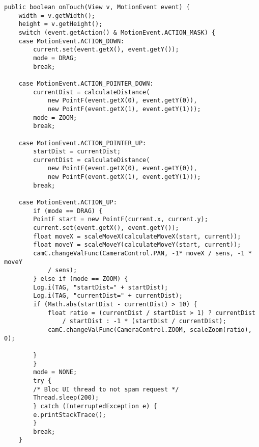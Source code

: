 \begin{lstlisting}
public boolean onTouch(View v, MotionEvent event) {
	width = v.getWidth();
	height = v.getHeight();
	switch (event.getAction() & MotionEvent.ACTION_MASK) {
	case MotionEvent.ACTION_DOWN:
	    current.set(event.getX(), event.getY());
	    mode = DRAG;
	    break;

	case MotionEvent.ACTION_POINTER_DOWN:
	    currentDist = calculateDistance(
		    new PointF(event.getX(0), event.getY(0)),
		    new PointF(event.getX(1), event.getY(1)));
	    mode = ZOOM;
	    break;

	case MotionEvent.ACTION_POINTER_UP:
	    startDist = currentDist;
	    currentDist = calculateDistance(
		    new PointF(event.getX(0), event.getY(0)),
		    new PointF(event.getX(1), event.getY(1)));
	    break;

	case MotionEvent.ACTION_UP:
	    if (mode == DRAG) {
		PointF start = new PointF(current.x, current.y);
		current.set(event.getX(), event.getY());
		float moveX = scaleMoveX(calculateMoveX(start, current));
		float moveY = scaleMoveY(calculateMoveY(start, current));
		camC.changeValFunc(CameraControl.PAN, -1* moveX / sens, -1 * moveY
			/ sens);
	    } else if (mode == ZOOM) {
		Log.i(TAG, "startDist=" + startDist);
		Log.i(TAG, "currentDist=" + currentDist);
		if (Math.abs(startDist - currentDist) > 10) {
		    float ratio = (currentDist / startDist > 1) ? currentDist
			    / startDist : -1 * (startDist / currentDist);
		    camC.changeValFunc(CameraControl.ZOOM, scaleZoom(ratio), 0);

		}
	    }
	    mode = NONE;
	    try {
		/* Bloc UI thread to not spam request */
		Thread.sleep(200);
	    } catch (InterruptedException e) {
		e.printStackTrace();
	    }
	    break;
	}
\end{lstlisting}
